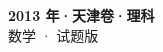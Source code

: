 \documentclass[zihao=-4, a4paper]{ctexart}
\begin{document}
\begin{center}
  {\Large\bfseries 2013 年·天津卷·理科}\\[4pt]
  {\large 数学 · 试题版}
\end{center}
\medskip
{}

\end{document}
